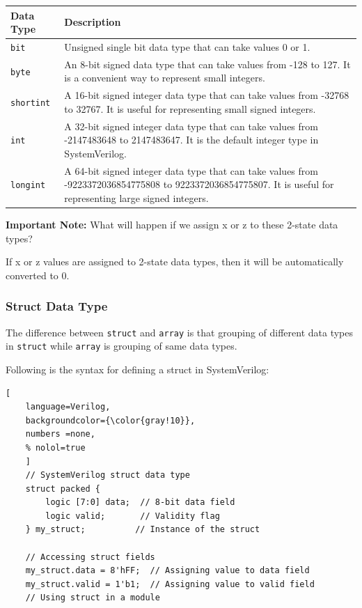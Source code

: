 \documentclass[12pt, a4paper]{article}
\begin{document}
\begin{center}
\begin{tabular}{|l|p{}|}
\hline
\textbf{Data Type} & \textbf{Description} \\
\hline
\texttt{bit} & Unsigned single bit data type that can take values 0 or 1. \\
\hline
\texttt{byte} & An 8-bit signed data type that can take values from -128 to 127. It is a convenient way to represent small integers. \\
\hline
\texttt{shortint} & A 16-bit signed integer data type that can take values from -32768 to 32767. It is useful for representing small signed integers. \\
\hline
\texttt{int} & A 32-bit signed integer data type that can take values from -2147483648 to 2147483647. It is the default integer type in SystemVerilog. \\
\hline
\texttt{longint} & A 64-bit signed integer data type that can take values from -9223372036854775808 to 9223372036854775807. It is useful for representing large signed integers. \\
\hline
\end{tabular}
\end{center}

\textbf{Important Note:} What will happen if we assign x or z to these 2-state data types?

If x or z values are assigned to 2-state data types, then it will be automatically converted to 0.

\subsubsection{Struct Data Type}
The difference between \texttt{struct} and \texttt{array}
is that grouping of different data types in \texttt{struct} while \texttt{array} is grouping of same data types.

\vspace{1em}
Following is the syntax for defining a struct in SystemVerilog:

\begin{lstlisting}[
    language=Verilog,
    backgroundcolor={\color{gray!10}},
    numbers =none,
    % nolol=true
    ]
    // SystemVerilog struct data type
    struct packed {
        logic [7:0] data;  // 8-bit data field
        logic valid;       // Validity flag
    } my_struct;          // Instance of the struct

    // Accessing struct fields
    my_struct.data = 8'hFF;  // Assigning value to data field
    my_struct.valid = 1'b1;  // Assigning value to valid field
    // Using struct in a module
\end{lstlisting}
\end{document}
